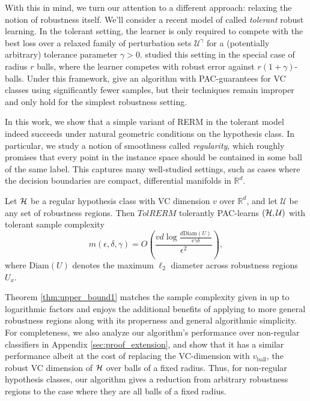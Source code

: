 With this in mind, we turn our attention to a different approach: relaxing the notion of robustness itself. We'll consider a recent model of \citet{Urner22} called \textit{tolerant} robust learning. In the tolerant setting, the learner is only required to compete with the best loss over a relaxed family of perturbation sets $\mathcal{U}^\gamma$ for a (potentially arbitrary) tolerance parameter $\gamma >0$. \citet{Urner22} studied this setting in the special case of radius $r$ balls, where the learner competes with robust error against $r(1 + \gamma)$-balls. Under this framework, \citet{Urner22} give an algorithm with PAC-guarantees for VC classes using significantly fewer samples, but their techniques remain improper and only hold for the simplest robustness setting.

In this work, we show that a simple variant of RERM in the tolerant model indeed succeeds under natural geometric conditions on the hypothesis class. In particular, we study a notion of smoothness called \textit{regularity}, which roughly promises that every point in the instance space should be contained in some ball of the same label. This captures many well-studied settings, such as cases where the decision boundaries are compact, differential manifolds in $\mathbb{R}^d$.
\begin{thm}\label{thm:upper_bound1}
Let $\mathcal H$ be a regular hypothesis class with VC dimension $v$ over $\mathbb{R}^d$, and let $\mathcal{U}$ be any set of robustness regions. Then $TolRERM$ tolerantly PAC-learns $(\mathcal H, \mathcal{U})$ with tolerant sample complexity 
\[
m(\epsilon, \delta, \gamma)  = O\left( \frac{vd\log \frac{d\text{Diam}(U)}{\epsilon\gamma\delta}}{\epsilon^2}\right),
\]
where $\text{Diam}(U)$ denotes the maximum $\ell_2$ diameter across robustness regions $U_x$. 
\end{thm}
Theorem \ref{thm:upper_bound1} matches the sample complexity given in \citet{Urner22} up to logarithmic factors and enjoys the additional benefits of applying to more general robustness regions along with its properness and general algorithmic simplicity. For completeness, we also analyze our algorithm's performance over non-regular classifiers in Appendix \ref{sec:proof_extension}, and show that it has a similar performance albeit at the cost of replacing the VC-dimension with $v_{\text{ball}}$, the robust VC dimension of $\mathcal H$ over balls of a fixed radius. Thus, for non-regular hypothesis classes, our algorithm gives a reduction from arbitrary robustness regions to the case where they are all balls of a fixed radius.

